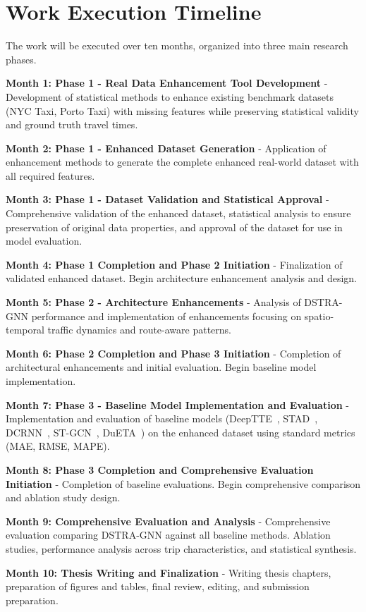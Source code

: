 \section{Work Execution Timeline}

The work will be executed over ten months, organized into three main research phases.

\textbf{Month 1: Phase 1 - Real Data Enhancement Tool Development} - Development of statistical methods to enhance existing benchmark datasets (NYC Taxi, Porto Taxi) with missing features while preserving statistical validity and ground truth travel times.

\textbf{Month 2: Phase 1 - Enhanced Dataset Generation} - Application of enhancement methods to generate the complete enhanced real-world dataset with all required features.

\textbf{Month 3: Phase 1 - Dataset Validation and Statistical Approval} - Comprehensive validation of the enhanced dataset, statistical analysis to ensure preservation of original data properties, and approval of the dataset for use in model evaluation.

\textbf{Month 4: Phase 1 Completion and Phase 2 Initiation} - Finalization of validated enhanced dataset. Begin architecture enhancement analysis and design.

\textbf{Month 5: Phase 2 - Architecture Enhancements} - Analysis of DSTRA-GNN performance and implementation of enhancements focusing on spatio-temporal traffic dynamics and route-aware patterns.

\textbf{Month 6: Phase 2 Completion and Phase 3 Initiation} - Completion of architectural enhancements and initial evaluation. Begin baseline model implementation.

\textbf{Month 7: Phase 3 - Baseline Model Implementation and Evaluation} - Implementation and evaluation of baseline models (DeepTTE~\cite{deepTTE2018}, STAD~\cite{abbar2020stad}, DCRNN~\cite{dcrnn2018}, ST-GCN~\cite{yu2018stgcn}, DuETA~\cite{dueta2023}) on the enhanced dataset using standard metrics (MAE, RMSE, MAPE).

\textbf{Month 8: Phase 3 Completion and Comprehensive Evaluation Initiation} - Completion of baseline evaluations. Begin comprehensive comparison and ablation study design.

\textbf{Month 9: Comprehensive Evaluation and Analysis} - Comprehensive evaluation comparing DSTRA-GNN against all baseline methods. Ablation studies, performance analysis across trip characteristics, and statistical synthesis.

\textbf{Month 10: Thesis Writing and Finalization} - Writing thesis chapters, preparation of figures and tables, final review, editing, and submission preparation.

